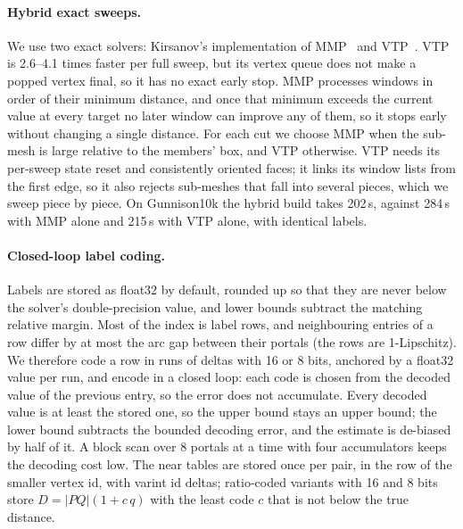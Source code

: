 \documentclass[sigconf,nonacm,screen]{acmart}
\begin{document}
\paragraph{Hybrid exact sweeps.}
We use two exact solvers: Kirsanov's implementation of MMP~\cite{surazhsky2005fast} and
VTP~\cite{qin2016fast}. VTP is 2.6--4.1 times faster per full sweep, but its vertex queue does not make a
popped vertex final, so it has no exact early stop. MMP processes windows in order of their minimum
distance, and once that minimum exceeds the current value at every target no later window can improve any of
them, so it stops early without changing a single distance. For each cut we choose MMP when the sub-mesh is
large relative to the members' box, and VTP otherwise. VTP needs its per-sweep state reset and consistently
oriented faces; it links its window lists from the first edge, so it also rejects sub-meshes that fall into
several pieces, which we sweep piece by piece. On Gunnison10k the hybrid build takes 202\,s, against 284\,s
with MMP alone and 215\,s with VTP alone, with identical labels.

\paragraph{Closed-loop label coding.}
Labels are stored as float32 by default, rounded up so that they are never below the solver's double-precision
value, and lower bounds subtract the matching relative margin. Most of the index is label rows, and neighbouring entries of a
row differ by at most the arc gap between their portals (the rows are 1-Lipschitz). We therefore code a row in
runs of deltas with 16 or 8 bits, anchored by a float32 value per run, and encode in a closed loop: each code
is chosen from the decoded value of the previous entry, so the error does not accumulate. Every decoded value
is at least the stored one, so the upper bound stays an upper bound; the lower bound subtracts the bounded
decoding error, and the estimate is de-biased by half of it. A block scan over 8 portals at a time with four
accumulators keeps the decoding cost low. The near tables are stored once per pair, in the row of the smaller
vertex id, with varint id deltas; ratio-coded variants with 16 and 8 bits store
$D=|PQ|(1+c\,q)$ with the least code $c$ that is not below the true distance.
\end{document}
